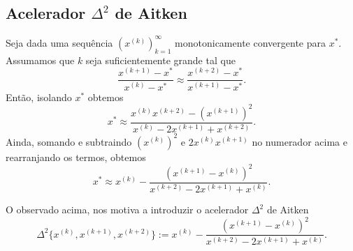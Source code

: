 \subsection{Acelerador $\Delta^2$ de Aitken}

Seja dada uma sequência $(x^{(k)})_{k=1}^\infty$ monotonicamente convergente para $x^*$. Assumamos que $k$ seja suficientemente grande tal que
\begin{equation}
  \frac{x^{(k+1)}-x^*}{x^{(k)}-x^*} \approx \frac{x^{(k+2)}-x^*}{x^{(k+1)}-x^*}.
\end{equation}
Então, isolando $x^*$ obtemos
\begin{equation}
  x^* \approx \frac{x^{(k)}x^{(k+2)}-(x^{(k+1)})^2}{x^{(k)}-2x^{(k+1)}+x^{(k+2)}}.
\end{equation}
Ainda, somando e subtraindo $(x^{(k)})^2$ e $2x^{(k)}x^{(k+1)}$ no numerador acima e rearranjando os termos, obtemos
\begin{equation}
  x^* \approx x^{(k)} - \frac{(x^{(k+1)}-x^{(k)})^2}{x^{(k+2)}-2x^{(k+1)}+x^{(k)}}.
\end{equation}

O observado acima, nos motiva a introduzir o acelerador $\Delta^2$ de Aitken
\begin{equation}
  \Delta^2\{x^{(k)},x^{(k+1)},x^{(k+2)}\} := x^{(k)} - \frac{(x^{(k+1)}-x^{(k)})^2}{x^{(k+2)}-2x^{(k+1)}+x^{(k)}}.
\end{equation}


